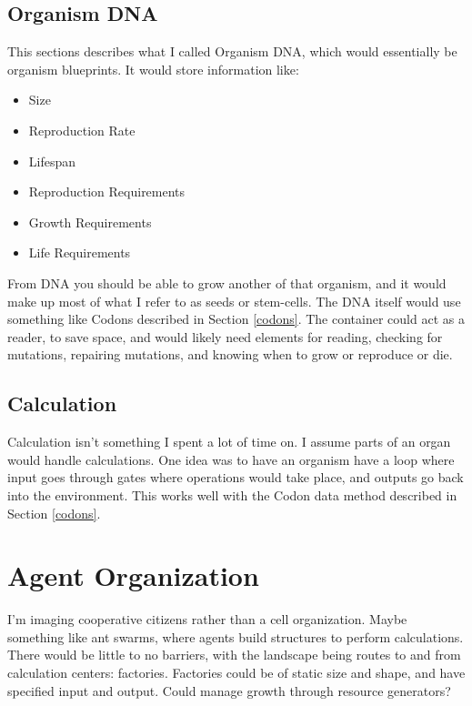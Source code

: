 \documentclass[article,12pt,oneside]{memoir}
\begin{document}
\section{Organism DNA}

This sections describes what I called Organism DNA, which would essentially be organism blueprints.
It would store information like:

\begin{itemize}
	\item Size
	\item Reproduction Rate
	\item Lifespan
	\item Reproduction Requirements
	\item Growth Requirements
	\item Life Requirements
\end{itemize}

From DNA you should be able to grow another of that organism, and it would make up most of what I refer to as seeds or stem-cells.
The DNA itself would use something like Codons described in Section \ref{codons}.
The container could act as a reader, to save space, and would likely need elements for reading, checking for mutations, repairing mutations, and knowing when to grow or reproduce or die.

\section{Calculation}

Calculation isn't something I spent a lot of time on.
I assume parts of an organ would handle calculations.
One idea was to have an organism have a loop where input goes through gates where operations would take place, and outputs go back into the environment.
This works well with the Codon data method described in Section \ref{codons}.



\pagebreak
\chapter{Agent Organization}

I'm imaging cooperative citizens rather than a cell organization.
Maybe something like ant swarms, where agents build structures to perform calculations.
There would be little to no barriers, with the landscape being routes to and from calculation centers: factories.
Factories could be of static size and shape, and have specified input and output.
Could manage growth through resource generators?
\end{document}
